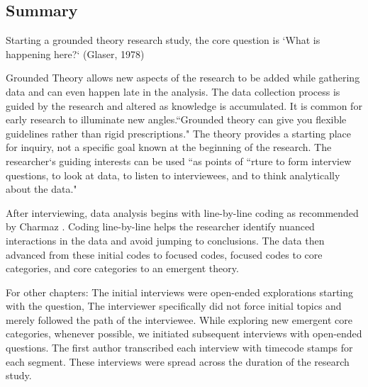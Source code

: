 \subsection{Summary}
Starting a grounded theory research study, the core question is `What is happening here?` (Glaser, 1978)

Grounded Theory allows new aspects of the research to be added while gathering data and can even happen late in the analysis. The data collection process is guided by the research and altered as knowledge is accumulated. It is common for early research to illuminate new angles.``Grounded theory can give you flexible guidelines rather than rigid prescriptions." The theory provides a starting place for inquiry, not a specific goal known at the beginning of the research. The researcher`s guiding interests can be used ``as points of  ``rture to form interview questions, to look at data, to listen to interviewees, and to think analytically about the data."

After interviewing, data analysis begins with line-by-line coding as recommended by Charmaz \cite{Charmaz}. Coding line-by-line helps the researcher identify nuanced interactions in the data and avoid jumping to conclusions. The data then advanced from these initial codes to focused codes, focused codes to core categories, and core categories to an emergent theory. 











For other chapters:
The initial interviews were open-ended explorations starting with the question,  The interviewer specifically did not force initial topics and merely followed the path of the interviewee. While exploring new emergent core categories, whenever possible, we initiated subsequent interviews with open-ended questions. The first author transcribed each interview with timecode stamps for each segment. These interviews were spread across the duration of the research study. 
